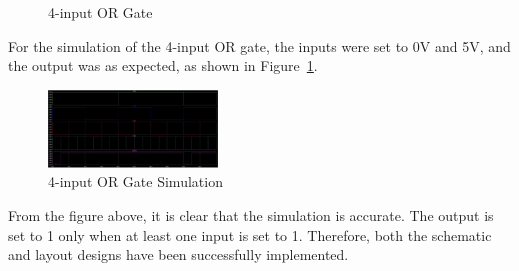 \documentclass[conference]{IEEEtran}
\begin{document}
\begin{figure}[h]
    \centering
    \hfill
    \caption{4-input OR Gate}
\end{figure}

For the simulation of the 4-input OR gate, the inputs were set to 0V and 5V, and the output was as expected, as shown in Figure~\ref{fig:4inputORGateSimulation}.
\begin{figure}[h]
    \centering
    \includegraphics[width=0.4\textwidth]{assets/4inputORGateSimulation.jpg}
    \caption{4-input OR Gate Simulation}
    \label{fig:4inputORGateSimulation}
\end{figure}

From the figure above, it is clear that the simulation is accurate. The output is set to 1 only when at least one input is set to 1. Therefore, both the schematic and layout designs have been successfully implemented.
\end{document}
